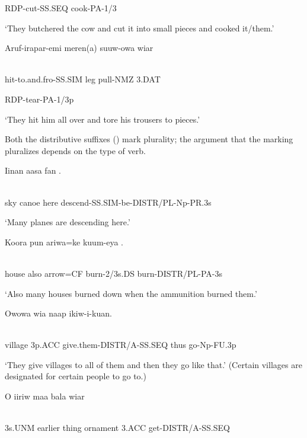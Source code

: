 RDP-cut-SS.SEQ  cook-PA-1/3

`They butchered the cow and cut it into small pieces and cooked it/them.'

\ea%
\label{ex:x1297}
\gll Aruf-irapar-emi  meren(a)  suuw-owa  wiar \\
      \\
\glt
\z

hit-to.and.fro-SS.SIM  leg  pull-NMZ  3.DAT


RDP-tear-PA-1/3p

`They hit him all over and tore his trousers to pieces.'

Both the distributive suffixes () mark plurality; the argument that the marking pluralizes depends on the type of verb. 

\ea%
\label{ex:x1300}
\gll Iinan  aasa  fan  . \\
      \\
\glt
\z

sky  canoe  here  descend-SS.SIM-be-DISTR/PL-Np-PR.3s

`Many planes are descending here.'

\ea%
\label{ex:x1299}
\gll Koora  pun  ariwa=ke  kuum-eya  . \\
      \\
\glt
\z

house  also  arrow=CF  burn-2/3s.DS  burn-DISTR/PL-PA-3s

`Also many houses burned down when the ammunition burned them.'

\ea%
\label{ex:x1301}
\gll Owowa  wia    naap  ikiw-i-kuan. \\
      \\
\glt
\z

village  3p.ACC  give.them-DISTR/A-SS.SEQ  thus  go-Np-FU.3p

`They give villages to all of them and then they go like that.' (Certain villages are designated for certain people to go to.)

\ea%
\label{ex:x1302}
\gll O  iiriw  maa  bala  wiar   \\
      \\
\glt
\z

3s.UNM  earlier  thing  ornament  3.ACC  get-DISTR/A-SS.SEQ

